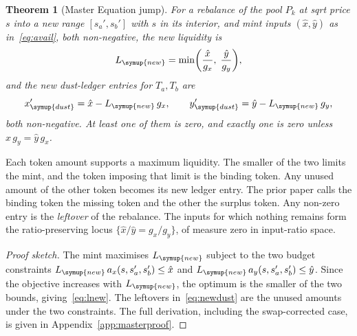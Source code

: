 \documentclass[11pt,a4paper]{article}
\theoremstyle{siphon}
\newtheorem{theorem}{Theorem}
\begin{document}
\begin{theorem}[Master Equation jump]\label{thm:binding}
For a rebalance of the pool $P_k$ at sqrt price $s$ into a new range $[s_a', s_b']$ with $s$ in its interior, and mint inputs $(\hat x, \hat y)$ as in~\eqref{eq:avail}, both non-negative, the new liquidity is
\begin{equation}\label{eq:lnew}
L_{\symup{new}}  =  \min\biggl(\frac{\hat x}{g_x},\; \frac{\hat y}{g_y}\biggr),
\end{equation}
and the new dust-ledger entries for $T_a, T_b$ are
\begin{equation}\label{eq:newdust}
x_{\symup{dust}}'  =  \hat x - L_{\symup{new}}\,g_x, \qquad y_{\symup{dust}}'  =  \hat y - L_{\symup{new}}\,g_y,
\end{equation}
both non-negative. At least one of them is zero, and exactly one is zero unless $\hat x\,g_y = \hat y\,g_x$.
\end{theorem}

\noindent Each token amount supports a maximum liquidity. The smaller of the two limits the mint, and the token imposing that limit is the binding token. Any unused amount of the other token becomes its new ledger entry. The prior paper calls the binding token the missing token and the other the surplus token. Any non-zero entry is the \emph{leftover} of the rebalance. The inputs for which nothing remains form the ratio-preserving locus $\{\hat x / \hat y = g_x / g_y\}$, of measure zero in input-ratio space.

\begin{proof}[Proof sketch]
The mint maximises $L_{\symup{new}}$ subject to the two budget constraints $L_{\symup{new}}\,a_x(s, s_a', s_b') \leq \hat x$ and $L_{\symup{new}}\,a_y(s, s_a', s_b') \leq \hat y$. Since the objective increases with $L_{\symup{new}}$, the optimum is the smaller of the two bounds, giving~\eqref{eq:lnew}. The leftovers in~\eqref{eq:newdust} are the unused amounts under the two constraints. The full derivation, including the swap-corrected case, is given in Appendix~\ref{app:masterproof}.
\end{proof}
\end{document}
